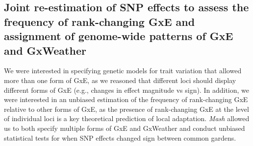 \documentclass[
  9pt,
  twocolumn,
  twoside]{pnas-new}
\begin{document}
\subsection{Joint re-estimation of SNP effects to assess the frequency
of rank-changing GxE and assignment of genome-wide patterns of GxE and
GxWeather}\label{joint-re-estimation-of-snp-effects-to-assess-the-frequency-of-rank-changing-gxe-and-assignment-of-genome-wide-patterns-of-gxe-and-gxweather}

We were interested in specifying genetic models for trait variation that
allowed more than one form of GxE, as we reasoned that different loci
should display different forms of GxE (e.g., changes in effect magnitude
vs sign). In addition, we were interested in an unbiased estimation of
the frequency of rank-changing GxE relative to other forms of GxE, as
the presence of rank-changing GxE at the level of individual loci is a
key theoretical prediction of local adaptation. \emph{Mash} allowed us
to both specify multiple forms of GxE and GxWeather and conduct unbiased
statistical tests for when SNP effects changed sign between common
gardens.
\end{document}
